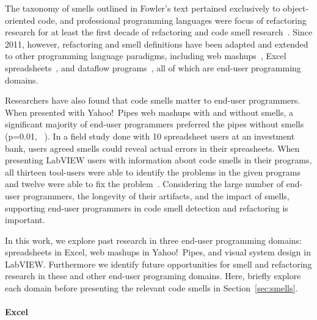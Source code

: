 \documentclass[10pt,conference,compsocconf]{IEEEtran}
\begin{document}
The taxonomy of smells outlined in Fowler's text pertained exclusively to object-oriented code, and professional programming languages were focus of refactoring research for at least the first decade of refactoring and code smell research~\cite{Mens:2004:SSR:972215.972286}.
Since 2011, however, refactoring and smell definitions have been adapted and extended to other 
programming language paradigms, including web mashups~\cite{Stolee2011, StoleeTSE2013}, Excel spreadsheets~\cite{Hermans2011, Hermans2012inter, hermans2014bumblebee}, and dataflow programs~\cite{chambers2013smell}, all of which are end-user programming domains. 

Researchers have also found that code smells matter to end-user programmers. When presented with Yahoo!\ Pipes web mashups with and without smells, a significant majority of end-user programmers preferred the pipes without smells (p=0.01, ~\cite{StoleeTSE2013}). In a field study done with 10 spreadsheet users at an investment bank, users agreed smells could reveal actual errors in their spreasheets. When presenting LabVIEW users with information about code smells in their programs, all thirteen tool-users were able to identify the problems in the given programs and twelve were able to fix the problem~\cite{chambers2013smell}.
Considering the large number of end-user programmers, the longevity of their artifacts, and the impact of smells, supporting end-user programmers in code smell detection and refactoring is important. 

In this work, we explore past research in three end-user programming domains: spreadsheets in Excel, web mashups in Yahoo!\ Pipes, and visual system design in LabVIEW. Furthermore we identify future opportunities for smell and refactoring research in these and other end-user programing domains. Here, briefly explore each domain  before presenting the relevant code smells in  Section~\ref{sec:smells}.

\paragraph{Excel}
\end{document}
